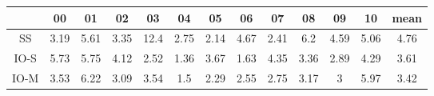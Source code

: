 \begin{tabular}{|c|c|c|c|c|c|c|c|c|c|c|c|c|}
\hline
 & 00 & 01 & 02 & 03 & 04 & 05 & 06 & 07 & 08 & 09 & 10 & mean \\
\hline
SS & 3.19 & 5.61 & 3.35 & 12.4 & 2.75 & 2.14 & 4.67 & 2.41 & 6.2 & 4.59 & 5.06 & 4.76 \\
\hline
IO-S & 5.73 & 5.75 & 4.12 & 2.52 & 1.36 & 3.67 & 1.63 & 4.35 & 3.36 & 2.89 & 4.29 & 3.61 \\
\hline
IO-M & 3.53 & 6.22 & 3.09 & 3.54 & 1.5 & 2.29 & 2.55 & 2.75 & 3.17 & 3 & 5.97 & 3.42 \\
\hline
\end{tabular}